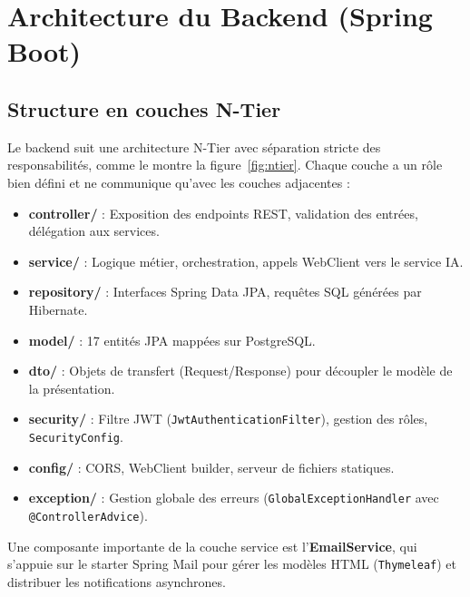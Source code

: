 \documentclass[12pt,a4paper]{report}
\begin{document}
\section{Architecture du Backend (Spring Boot)}

\subsection{Structure en couches N-Tier}

Le backend suit une architecture N-Tier avec séparation stricte des responsabilités, comme le montre la figure~\ref{fig:ntier}. Chaque couche a un rôle bien défini et ne communique qu'avec les couches adjacentes :

\begin{itemize}
  \item \textbf{controller/} : Exposition des endpoints REST, validation des entrées, délégation aux services.
  \item \textbf{service/} : Logique métier, orchestration, appels WebClient vers le service IA.
  \item \textbf{repository/} : Interfaces Spring Data JPA, requêtes SQL générées par Hibernate.
  \item \textbf{model/} : 17 entités JPA mappées sur PostgreSQL.
  \item \textbf{dto/} : Objets de transfert (Request/Response) pour découpler le modèle de la présentation.
  \item \textbf{security/} : Filtre JWT (\texttt{JwtAuthenticationFilter}), gestion des rôles, \texttt{SecurityConfig}.
  \item \textbf{config/} : CORS, WebClient builder, serveur de fichiers statiques.
  \item \textbf{exception/} : Gestion globale des erreurs (\texttt{GlobalExceptionHandler} avec \texttt{@ControllerAdvice}).
\end{itemize}

Une composante importante de la couche service est l'\textbf{EmailService}, qui s'appuie sur le starter Spring Mail pour gérer les modèles HTML (\texttt{Thymeleaf}) et distribuer les notifications asynchrones.
\end{document}
